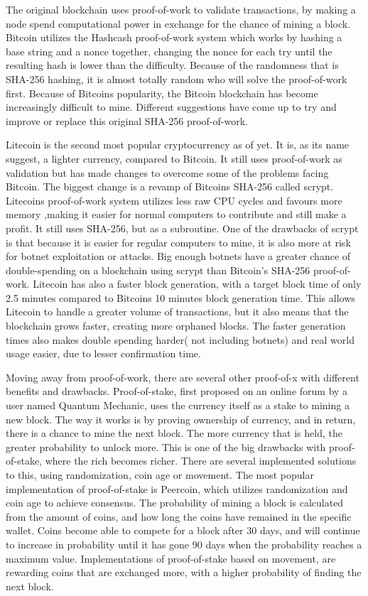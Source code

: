 \documentclass[12pt]{article}
\begin{document}
The original blockchain uses proof-of-work to validate transactions, by making a node spend computational power in exchange for the chance of mining a block. Bitcoin utilizes the Hashcash\cite{hashcash} proof-of-work system which works by hashing a base string and a nonce together, changing the nonce for each try until the resulting hash is lower than the difficulty. Because of the randomness that is SHA-256 hashing, it is almost totally random who will solve the proof-of-work first. Because of Bitcoins popularity, the Bitcoin blockchain has become increasingly difficult to mine. Different suggestions have come up to try and improve or replace this original SHA-256 proof-of-work. 

Litecoin is the second most popular cryptocurrency as of yet. It is, as its name suggest, a lighter currency, compared to Bitcoin. It still uses proof-of-work as validation but has made changes to overcome some of the problems facing Bitcoin. The biggest change is a revamp of Bitcoins SHA-256 called scrypt. Litecoins proof-of-work system utilizes less raw CPU cycles and  favours more memory ,making it easier for normal computers to contribute and still make a profit. It still uses SHA-256, but as a subroutine. One of the drawbacks of scrypt is that because it is easier for regular computers to mine, it is also more at risk for botnet exploitation or attacks. Big enough botnets have a greater chance of double-spending on a blockchain using scrypt than Bitcoin's SHA-256 proof-of-work. Litecoin has also a faster block generation, with a target block time of only 2.5 minutes compared to Bitcoins 10 minutes block generation time. This allows Litecoin to handle a greater volume of transactions, but it also means that the blockchain grows faster, creating more orphaned blocks. The faster generation times also makes double spending harder( not including botnets) and real world usage easier, due to lesser confirmation time. 

Moving away from proof-of-work, there are several other proof-of-x with different benefits and drawbacks. Proof-of-stake, first proposed on an online forum by a user named Quantum Mechanic, uses the currency itself as a stake to mining a new block. The way it works is by proving ownership of currency, and in return, there is a chance to mine the next block. The more currency that is held, the greater probability to unlock more. This is one of the big drawbacks with proof-of-stake, where the rich becomes richer. There are several implemented solutions to this, using randomization, coin age or movement. The most popular implementation of proof-of-stake is Peercoin, which utilizes randomization and coin age to achieve consensus. The probability of mining a block is calculated from the amount of coins, and how long the coins have remained in the specific wallet. Coins become able to compete for a block after 30 days, and will continue to increase in probability until it has gone 90 days when the probability reaches a maximum value. Implementations of proof-of-stake based on movement, are rewarding coins that are exchanged more, with a higher probability of finding the next block. 
\end{document}

